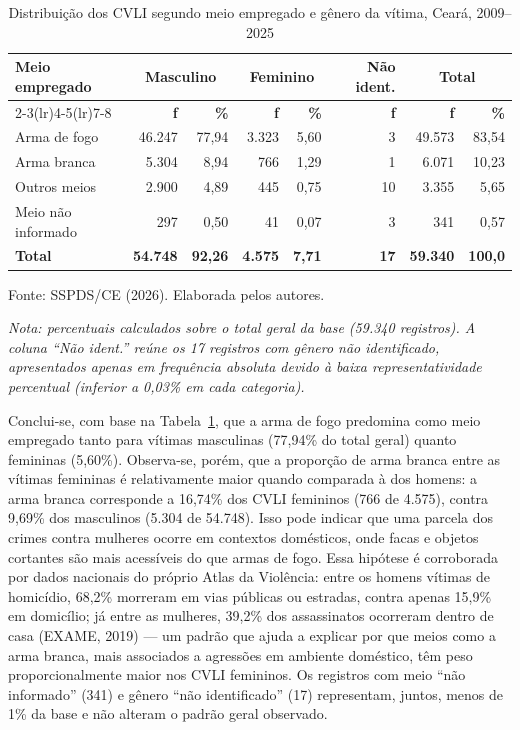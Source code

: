 \documentclass[12pt,a4paper]{article}
\newcommand{\fonte}[1]{  \vspace{-2mm}
  \begin{center}\footnotesize Fonte: #1\end{center}
}
\begin{document}
\begin{table}[H]
\centering
\caption{Distribuição dos CVLI segundo meio empregado e gênero da vítima, Ceará, 2009--2025}
\label{tab:cruzada1}
\footnotesize
\begin{tabular}{lrrrrrrr}
\toprule
\multirow{2}{*}{\textbf{Meio empregado}} & \multicolumn{2}{c}{\textbf{Masculino}} & \multicolumn{2}{c}{\textbf{Feminino}} & \textbf{Não ident.} & \multicolumn{2}{c}{\textbf{Total}} \\
\cmidrule(lr){2-3}\cmidrule(lr){4-5}\cmidrule(lr){7-8}
 & \textbf{f} & \textbf{\%} & \textbf{f} & \textbf{\%} & \textbf{f} & \textbf{f} & \textbf{\%} \\
\midrule
Arma de fogo        & 46.247 & 77,94 & 3.323 & 5,60 & 3  & 49.573 & 83,54 \\
Arma branca         & 5.304  & 8,94  & 766   & 1,29 & 1  & 6.071  & 10,23 \\
Outros meios        & 2.900  & 4,89  & 445   & 0,75 & 10 & 3.355  & 5,65  \\
Meio não informado  & 297    & 0,50  & 41    & 0,07 & 3  & 341    & 0,57  \\
\midrule
\textbf{Total}      & \textbf{54.748} & \textbf{92,26} & \textbf{4.575} & \textbf{7,71} & \textbf{17} & \textbf{59.340} & \textbf{100,0} \\
\bottomrule
\end{tabular}
\end{table}
\fonte{SSPDS/CE (2026). Elaborada pelos autores.}

\small\textit{Nota: percentuais calculados sobre o total geral da base (59.340 registros). A coluna ``Não ident.'' reúne os 17 registros com gênero não identificado, apresentados apenas em frequência absoluta devido à baixa representatividade percentual (inferior a 0,03\% em cada categoria).}
\normalsize

\vspace{2mm}

Conclui-se, com base na Tabela~\ref{tab:cruzada1}, que a arma de fogo predomina como meio empregado tanto para vítimas masculinas (77,94\% do total geral) quanto femininas (5,60\%). Observa-se, porém, que a proporção de arma branca entre as vítimas femininas é relativamente maior quando comparada à dos homens: a arma branca corresponde a 16,74\% dos CVLI femininos (766 de 4.575), contra 9,69\% dos masculinos (5.304 de 54.748). Isso pode indicar que uma parcela dos crimes contra mulheres ocorre em contextos domésticos, onde facas e objetos cortantes são mais acessíveis do que armas de fogo. Essa hipótese é corroborada por dados nacionais do próprio Atlas da Violência: entre os homens vítimas de homicídio, 68,2\% morreram em vias públicas ou estradas, contra apenas 15,9\% em domicílio; já entre as mulheres, 39,2\% dos assassinatos ocorreram dentro de casa (EXAME, 2019) --- um padrão que ajuda a explicar por que meios como a arma branca, mais associados a agressões em ambiente doméstico, têm peso proporcionalmente maior nos CVLI femininos. Os registros com meio ``não informado'' (341) e gênero ``não identificado'' (17) representam, juntos, menos de 1\% da base e não alteram o padrão geral observado.
\end{document}
